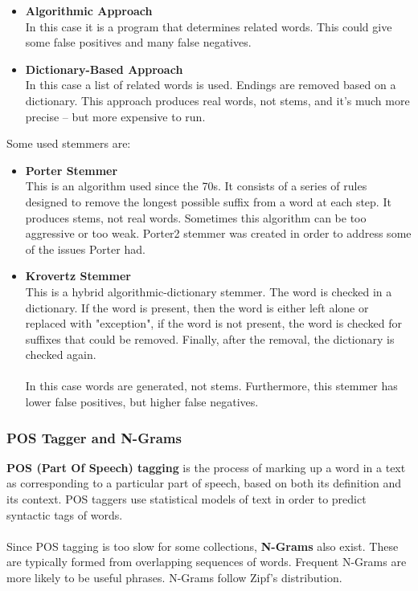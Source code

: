 \documentclass{article}
\begin{document}
\begin{itemize}
	\item \textbf{Algorithmic Approach}
	\vspace{.2cm} \\
	In this case it is a program that determines related words. This could give some false positives and many false negatives.
	
	\item \textbf{Dictionary-Based Approach}
	\vspace{.2cm} \\
	In this case a list of related words is used. Endings are removed based on a dictionary. This approach produces real words, not stems, and it's much more precise -- but more expensive to run.
\end{itemize}
Some used stemmers are:

\begin{itemize}
	\item \textbf{Porter Stemmer}
	\vspace{.2cm} \\
	This is an algorithm used since the 70s. It consists of a series of rules designed to remove the longest possible suffix from a word at each step. It produces stems, not real words. Sometimes this algorithm can be too aggressive or too weak. Porter2 stemmer was created in order to address some of the issues Porter had.
	
	\item \textbf{Krovertz Stemmer}
	\vspace{.2cm} \\
	This is a hybrid algorithmic-dictionary stemmer. The word is checked in a dictionary. If the word is present, then the word is either left alone or replaced with "exception", if the word is not present, the word is checked for suffixes that could be removed. Finally, after the removal, the dictionary is checked again. \\ \\
	In this case words are generated, not stems. Furthermore, this stemmer has lower false positives, but higher false negatives.
\end{itemize}

\subsubsection{POS Tagger and N-Grams}
\textbf{POS (Part Of Speech) tagging} is the process of marking up a word in a text as corresponding to a particular part of speech, based on both its definition and its context. POS taggers use statistical models of text in order to predict syntactic tags of words. \\ \\
Since POS tagging is too slow for some collections, \textbf{N-Grams} also exist. These are typically formed from overlapping sequences of words. Frequent N-Grams are more likely to be useful phrases. N-Grams follow Zipf's distribution.
\end{document}
